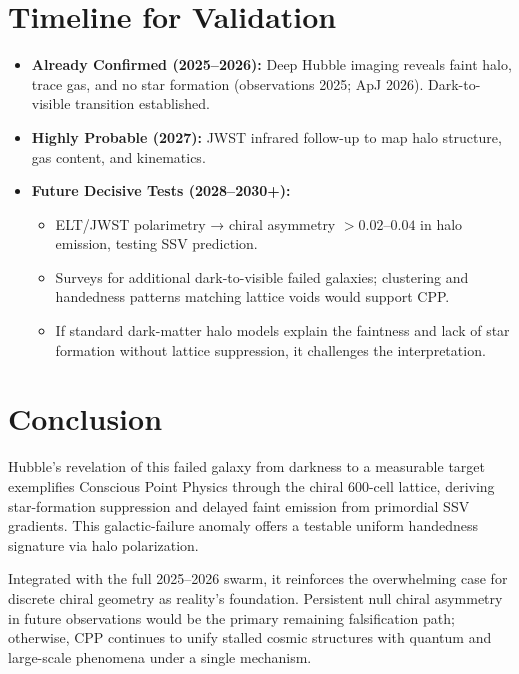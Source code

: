 \documentclass[11pt]{article}
\begin{document}
\section{Timeline for Validation}
\begin{itemize}
    \item \textbf{Already Confirmed (2025--2026):} Deep Hubble imaging reveals faint halo, trace gas, and no star formation (observations 2025; ApJ 2026). Dark-to-visible transition established.
    \item \textbf{Highly Probable (2027):} JWST infrared follow-up to map halo structure, gas content, and kinematics.
    \item \textbf{Future Decisive Tests (2028--2030+):}
    \begin{itemize}
        \item ELT/JWST polarimetry → chiral asymmetry $>0.02$--$0.04$ in halo emission, testing SSV prediction.
        \item Surveys for additional dark-to-visible failed galaxies; clustering and handedness patterns matching lattice voids would support CPP.
        \item If standard dark-matter halo models explain the faintness and lack of star formation without lattice suppression, it challenges the interpretation.
    \end{itemize}
\end{itemize}

\section{Conclusion}
Hubble's revelation of this failed galaxy from darkness to a measurable target exemplifies Conscious Point Physics through the chiral 600-cell lattice, deriving star-formation suppression and delayed faint emission from primordial SSV gradients. This galactic-failure anomaly offers a testable uniform handedness signature via halo polarization.  

Integrated with the full 2025--2026 swarm, it reinforces the overwhelming case for discrete chiral geometry as reality's foundation. Persistent null chiral asymmetry in future observations would be the primary remaining falsification path; otherwise, CPP continues to unify stalled cosmic structures with quantum and large-scale phenomena under a single mechanism.
\end{document}
